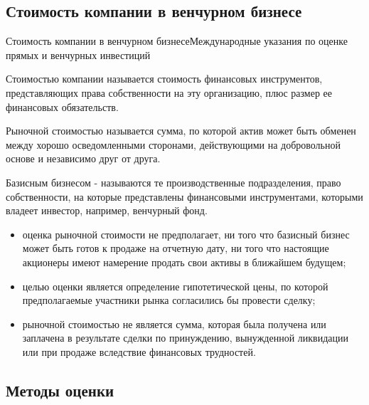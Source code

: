 \documentclass[_Venture_p2.tex]{subfiles}
\begin{document}
\subsection{Стоимость компании в венчурном бизнесе}
\begin{frame}[allowframebreaks]{Стоимость компании в венчурном бизнесе}{\scriptsize{Международные указания по оценке прямых и венчурных инвестиций}}
\begin{block}{Стоимостью компании}
	\quad
	называется стоимость финансовых инструментов, представляющих права собственности на эту организацию, плюс размер ее финансовых обязательств.
\end{block}

\pagebreak


\begin{block}{Рыночной стоимостью }
	\quad
	называется сумма, по которой актив может быть обменен между хорошо осведомленными сторонами, действующими на добровольной основе и независимо друг от друга.
\end{block}

\pagebreak

\begin{block}{Базисным бизнесом}
	\quad
	- называются те производственные подразделения, право собственности, на которые представлены финансовыми инструментами, которыми владеет инвестор, например, венчурный фонд.
\end{block}
\end{frame}

\begin{frame}[allowframebreaks]{}{}
\begin{itemize}
	\item оценка рыночной стоимости не предполагает, ни того что базисный бизнес может быть готов к продаже на отчетную дату, ни того что настоящие акционеры имеют намерение продать свои активы в ближайшем будущем; 
	
	\pagebreak
	\item целью оценки является определение гипотетической цены, по которой предполагаемые участники рынка согласились бы провести сделку;

	\item рыночной стоимостью не является сумма, которая была получена или заплачена в результате сделки по принуждению, вынужденной ликвидации или при продаже вследствие финансовых трудностей.
\end{itemize}
\end{frame}

\subsection{Методы оценки}
\end{document}
